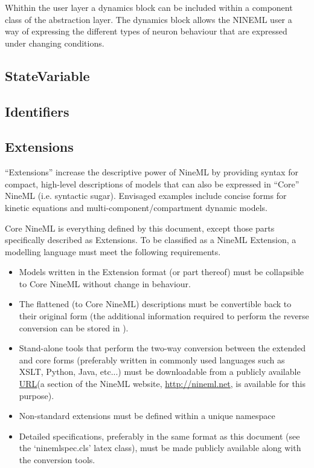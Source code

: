 \documentclass[draftspec]{ninemlspec}
\newcommand{\URL}{\href{http://en.wikipedia.org/wiki/Uniform_resource_locator}{URL}\xspace}
\newcommand{\Annotations}{\defRef{\textbf{\class{Annotations}}\xspace}{sec:Annotations}}
\begin{document}
Whithin the user layer a dynamics block can be included within a component class of the abstraction layer. The dynamics block allows the NINEML user a way of expressing the different types of neuron behaviour that are expressed under changing conditions.


\subsection{StateVariable}



\subsection{Identifiers}
\label{sec:identifier}


\subsection{Extensions}
\label{sec:extensions}

``Extensions'' increase the descriptive power of NineML by providing syntax for compact, high-level descriptions of models that can also be expressed in ``Core'' NineML (i.e. syntactic sugar). Envisaged examples include concise forms for kinetic equations and multi-component/compartment dynamic models. 

Core NineML is everything defined by this document, except those parts specifically described as Extensions. To be classified as a NineML Extension, a modelling language must meet the following requirements.
\begin{itemize}
\item Models written in the Extension format (or part thereof) must be collapsible to Core NineML without change in behaviour.
\item The flattened (to Core NineML) descriptions must be convertible back to their original form (the additional information required to perform the reverse conversion can be stored in \Annotations).
\item Stand-alone tools that perform the two-way conversion between the extended and core forms (preferably written in commonly used languages such as XSLT, Python, Java, etc...) must be downloadable from a publicly available \URL (a section of the NineML website, \href{http://nineml.net}{http://nineml.net}, is available for this purpose).
\item Non-standard extensions must be defined within a unique namespace
\item Detailed specifications, preferably in the same format as this document (see the `ninemlspec.cls' latex class), must be made publicly available along with the conversion tools.
 \label{item:collapsible}
\end{itemize}
\end{document}
